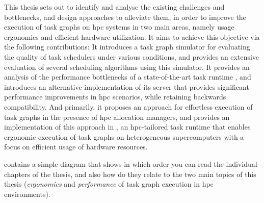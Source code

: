 This thesis sets out to identify and analyse the existing challenges and bottlenecks, and design
approaches to alleviate them, in order to improve the execution of task graphs on
\gls{hpc} systems in two main areas, namely usage ergonomics and efficient hardware
utilization. It aims to achieve this objective via the following contributions: It introduces a
task graph simulator for evaluating the quality of task schedulers under various conditions, and
provides an extensive evaluation of several scheduling algorithms using this simulator. It provides
an analysis of the performance bottlenecks of a state-of-the-art task runtime
\dask{}, and introduces an alternative implementation of its server that provides
significant performance improvements in \gls{hpc} scenarios, while retaining backwards
compatibility. And primarily, it proposes an approach for effortless execution of task graphs in
the presence of \gls{hpc} allocation managers, and provides an implementation of this
approach in \hyperqueue{}, an \gls{hpc}-tailored task runtime that enables
ergonomic execution of task graphs on heterogeneous supercomputers with a focus on efficient usage
of hardware resources.

 contains a simple diagram that shows in which order you can read
the individual chapters of the thesis, and also how do they relate to the two main topics of this
thesis (\emph{ergonomics} and \emph{performance} of task graph execution in
\gls{hpc} environments).


